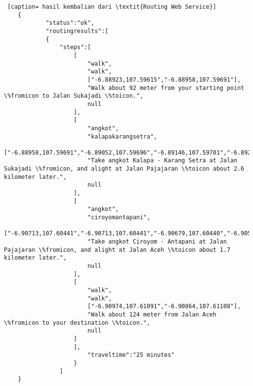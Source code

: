 \begin{itemize}
	\begin{lstlisting} [caption= hasil kembalian dari \textit{Routing Web Service}]
	{
			"status":"ok",
			"routingresults":[
			{
				"steps":[
					[
						"walk",
						"walk",
						["-6.88923,107.59615","-6.88958,107.59691"],
						"Walk about 92 meter from your starting point \%fromicon to Jalan Sukajadi \%toicon.",
						null
					],
					[
						"angkot",
						"kalapakarangsetra",
						["-6.88958,107.59691","-6.89052,107.59696","-6.89146,107.59701","-6.89239,107.59706","-6.89333,107.59711","-6.89333,107.59711","-6.89466,107.59719","-6.89598,107.59727","-6.89598,107.59727","-6.89700,107.59731","-6.89801,107.59735","-6.89903,107.59740","-6.90005,107.59744","-6.90005,107.59744","-6.90113,107.59747","-6.90222,107.59751","-6.90331,107.59754","-6.90439,107.59757","-6.90439,107.59757","-6.90540,107.59760","-6.90641,107.59763","-6.90641,107.59763","-6.90650,107.59781","-6.90667,107.59887","-6.90684,107.59992","-6.90684,107.59992","-6.90690,107.60086","-6.90696,107.60179","-6.90696,107.60179","-6.90704,107.60306","-6.90711,107.60433"],
						"Take angkot Kalapa - Karang Setra at Jalan Sukajadi \%fromicon, and alight at Jalan Pajajaran \%toicon about 2.6 kilometer later.",
						null
					],
					[
						"angkot",
						"ciroyomantapani",
						["-6.90713,107.60441","-6.90713,107.60441","-6.90679,107.60440","-6.90563,107.60438","-6.90448,107.60435","-6.90448,107.60435","-6.90429,107.60448","-6.90422,107.60487","-6.90403,107.60527","-6.90397,107.60564","-6.90402,107.60608","-6.90436,107.60671","-6.90488,107.60725","-6.90522,107.60749","-6.90588,107.60771","-6.90625,107.60772","-6.90642,107.60783","-6.90658,107.60806","-6.90678,107.60929","-6.90678,107.60929","-6.90685,107.60939","-6.90787,107.60939","-6.90889,107.60939","-6.90889,107.60939","-6.90913,107.60920","-6.90918,107.60878","-6.90924,107.60847","-6.90934,107.60843","-6.91008,107.60880","-6.91026,107.60890","-6.91030,107.60905","-6.91029,107.60923","-6.91020,107.60951","-6.90976,107.61056","-6.90976,107.61056","-6.90974,107.61091"],
						"Take angkot Ciroyom - Antapani at Jalan Pajajaran \%fromicon, and alight at Jalan Aceh \%toicon about 1.7 kilometer later.",
						null
					],
					[
						"walk",
						"walk",
						["-6.90974,107.61091","-6.90864,107.61108"],
						"Walk about 124 meter from Jalan Aceh \%fromicon to your destination \%toicon.",
						null
					]
					],
						"traveltime":"25 minutes"
					}
				]
	}\end{lstlisting}
\end{itemize}

